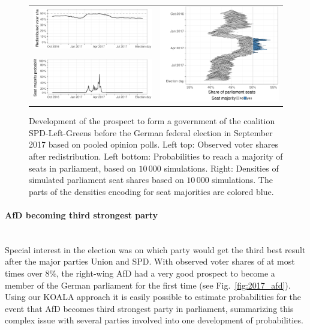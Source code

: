 \documentclass[smallcondensed]{svjour3}     %
\begin{document}
\begin{figure}[H]\centering
\begin{tabular}{ll}
\includegraphics[height=.15\textwidth]{figures/2017_pooled_spdleftgreens_rawSharesRedist.pdf}
&
\multirow{2}{*}[13ex]{\includegraphics[height=30ex]{figures/2017_pooled_spdleftgreens_ridgeline.pdf}}
\\
\includegraphics[height=.15\textwidth]{figures/2017_pooled_spdleftgreens_prob.pdf}
\end{tabular}
\caption{Development of the prospect to form a government of the coalition SPD-Left-Greens before the German federal election in September 2017 based on pooled opinion polls.
Left top: Observed voter shares after redistribution. Left bottom: Probabilities to reach a majority of seats in parliament, based on $10\,000$ simulations. Right: Densities of simulated parliament seat shares based on $10\,000$ simulations. The parts of the densities encoding for seat majorities are colored blue.
\label{fig:2017_spdleftgreens}
}
\end{figure}


\paragraph{AfD becoming third strongest party} \ \\
Special interest in the election was on which party would
get the third best result after the major parties Union and SPD.
With observed voter shares of at most times over $8\%$,
the right-wing AfD had a very good prospect to become a member
of the German parliament for the first time (see Fig.~\ref{fig:2017_afd}).
Using our KOALA approach it is easily possible to estimate probabilities
for the event that AfD becomes third strongest party in parliament,
summarizing this complex issue with several parties involved into one
development of probabilities.
\end{document}
